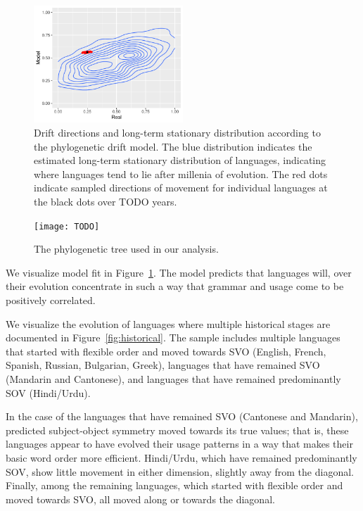 \documentclass[11pt,a4paper]{article}
\begin{document}
\begin{figure}
    \centering
    \includegraphics[width=0.5\textwidth]{change/visualize/stationary.pdf}
    \caption{Drift directions and long-term stationary distribution according to the phylogenetic drift model.
    The blue distribution indicates the estimated long-term stationary distribution of languages, indicating where languages tend to lie after millenia of evolution.
    The red dots indicate sampled directions of movement for individual languages at the black dots over TODO years.}
    \label{fig:drift-model}
\end{figure}

\begin{figure}
    \centering
    \texttt{[image: TODO]}
    \caption{The phylogenetic tree used in our analysis.}
    \label{fig:phylogenetic-tree}
\end{figure}

We visualize model fit in Figure~\ref{fig:drift-model}.
The model predicts that languages will, over their evolution concentrate in such a way that grammar and usage come to be positively correlated.

We visualize the evolution of languages where multiple historical stages are documented in Figure~\ref{fig:historical}.
The sample includes multiple languages that started with flexible order and moved towards SVO (English, French, Spanish, Russian, Bulgarian, Greek), languages that have remained SVO (Mandarin and Cantonese), and languages that have remained predominantly SOV (Hindi/Urdu).

In the case of the languages that have remained SVO (Cantonese and Mandarin), predicted subject-object symmetry moved towards its true values; that is, these languages appear to have evolved their usage patterns in a way that makes their basic word order more efficient.
Hindi/Urdu, which have remained predominantly SOV, show little movement in either dimension, slightly away from the diagonal.
Finally, among the remaining languages, which started with flexible order and moved towards SVO, all moved along or towards the diagonal.
\end{document}
